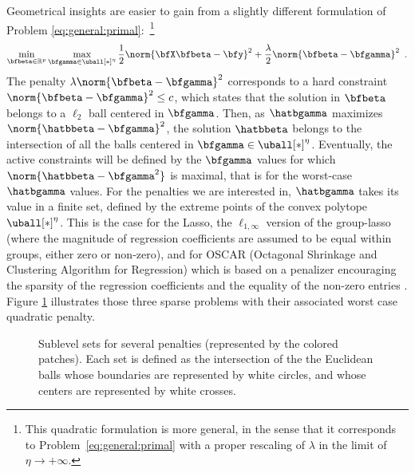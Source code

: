 Geometrical insights are easier to gain from a slightly different formulation of
Problem \eqref{eq:general:primal}:~\footnote{%
  This quadratic formulation is more general, in the sense that it corresponds to
  Problem~\eqref{eq:general:primal} with a proper rescaling of $\lambda$ in the
  limit of $\eta\rightarrow+\infty$.
}
%
\begin{equation}\label{eq:general:dual}
  \min_{\bfbeta\in\mathbb{R}^p} \max_{\bfgamma\in\uball[*]^\eta}
    \frac{1}{2} \norm{\bfX \bfbeta - \bfy}^2 + \frac{\lambda}{2} \norm{\bfbeta - \bfgamma}^2
  \enspace.
\end{equation}
The penalty $\lambda\norm{\bfbeta - \bfgamma}^2$ corresponds to a hard
constraint $\norm{\bfbeta - \bfgamma}^2\leq c$, which states that the 
solution in $\bfbeta$ belongs to a $\ell_{2}$ ball centered in $\bfgamma$.
Then, as $\hatbgamma$ maximizes $\norm{\hatbbeta - \bfgamma}^2$, the
solution $\hatbbeta$ belongs to the intersection of all the balls
centered in $\bfgamma\in\uball[*]^\eta$.
Eventually, the active constraints will be defined by the $\bfgamma$ values for
which $\norm{\hatbbeta - {\bfgamma}^2}$ is maximal, that is for the
worst-case $\hatbgamma$ values. 
For the penalties we are interested in, $\hatbgamma$ takes its value in a
finite set, defined by the extreme points of the convex polytope $\uball[*]^\eta$.
% 
% 
This is the case for the Lasso,
the $\ell_{1,\infty}$ version of the group-lasso 
(where the magnitude of regression coefficients are assumed to be equal within
groups, either zero or non-zero), 
and for OSCAR (Octagonal Shrinkage and Clustering Algorithm for Regression)
which is based on a penalizer encouraging the sparsity of the regression
coefficients and the equality of the non-zero entries \citep{Bondell08}.
%
Figure \ref{fig:penalties} illustrates  those three  sparse problems
with their  associated worst case quadratic penalty.


% 
\begin{figure}
  \begin{center} 
    \caption{Sublevel sets for several penalties (represented by the 
             colored patches).  
             Each set is defined as the intersection of the the Euclidean balls 
             whose boundaries are represented by white circles, and whose centers are
             represented by white crosses.}
     \label{fig:penalties}
    \end{center} 
\end{figure}


